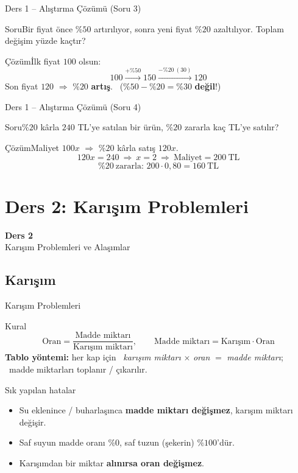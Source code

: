 \documentclass[aspectratio=169,11pt]{beamer}
\newcommand{\soru}[3]{%
\begin{frame}{#1}
  \begin{block}{Soru}\large #2\end{block}
  \pause
  \begin{exampleblock}{Çözüm}\large #3\end{exampleblock}
\end{frame}}
\begin{document}
\soru{Ders 1 -- Alıştırma Çözümü (Soru 3)}
{Bir fiyat önce \(\%50\) artırılıyor, sonra yeni fiyat \(\%20\) azaltılıyor. Toplam değişim yüzde kaçtır?}
{İlk fiyat \(100\) olsun:
\[100\xrightarrow{+\%50}150\xrightarrow{-\%20\ (30)}120\]
Son fiyat \(120\) \(\Rightarrow\) \(\%20\) \textbf{artış}. \ (\(\%50-\%20=\%30\) \textbf{değil}!)}

\soru{Ders 1 -- Alıştırma Çözümü (Soru 4)}
{\(\%20\) kârla \(240\) TL'ye satılan bir ürün, \(\%20\) zararla kaç TL'ye satılır?}
{Maliyet \(100x\) \(\Rightarrow\) \(\%20\) kârla satış \(120x\).
\[120x=240\ \Rightarrow\ x=2\ \Rightarrow\ \text{Maliyet}=200\ \text{TL}\]
\[\%20\ \text{zararla: } 200\cdot 0{,}80=160\ \text{TL}\]}

\section{Ders 2: Karışım Problemleri}
\begin{frame}
\centering\Large\color{anamavi}\textbf{Ders 2}\\[6pt]\normalsize Karışım Problemleri ve Alaşımlar
\end{frame}

\subsection{Karışım}
\begin{frame}{Karışım Problemleri}
\begin{block}{Kural}
\[\text{Oran}=\frac{\text{Madde miktarı}}{\text{Karışım miktarı}},\qquad \text{Madde miktarı}=\text{Karışım}\cdot\text{Oran}\]
\textbf{Tablo yöntemi:} her kap için \ \textit{karışım miktarı} \(\times\) \textit{oran} \(=\) \textit{madde miktarı}; \ madde miktarları toplanır / çıkarılır.
\end{block}
\begin{alertblock}{Sık yapılan hatalar}
\begin{itemize}
\item Su eklenince / buharlaşınca \textbf{madde miktarı değişmez}, karışım miktarı değişir.
\item Saf suyun madde oranı \(\%0\), saf tuzun (şekerin) \(\%100\)'dür.
\item Karışımdan bir miktar \textbf{alınırsa oran değişmez}.
\end{itemize}
\end{alertblock}
\end{frame}
\end{document}
